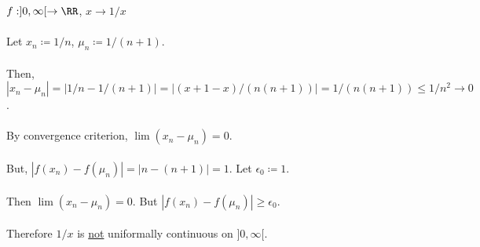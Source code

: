 \documentclass[class=scrartcl, crop=false]{standalone}
\begin{document}
\begin{example}
  $f: ]0, \infty[ \to \RR$, $x \to 1 / x$ 
  \\\\
  Let $x_n \coloneqq 1 / n$, $\mu_n \coloneqq 1 / (n + 1)$.
  \\\\
  Then, $|x_n - \mu_n| = |1 / n - 1 / (n + 1)| = |(x + 1 - x) / (n(n + 1)) | = 1 / (n(n + 1))  \leq 1 / n^2 \to 0$.
  \\\\
  By convergence criterion, $\lim(x_n - \mu_n) = 0$.
  \\\\
  But, $|f(x_n) - f(\mu_n)| = |n - (n + 1)| = 1$. Let $\epsilon_0 \coloneqq 1$.
  \\\\
  Then $\lim(x_n - \mu_n) = 0$. But $|f(x_n) - f(\mu_n)| \geq \epsilon_0$.
  \\\\
  Therefore $1 / x$ is \ul{not} uniformally continuous on $]0, \infty[$.
\end{example} 
\end{document}
